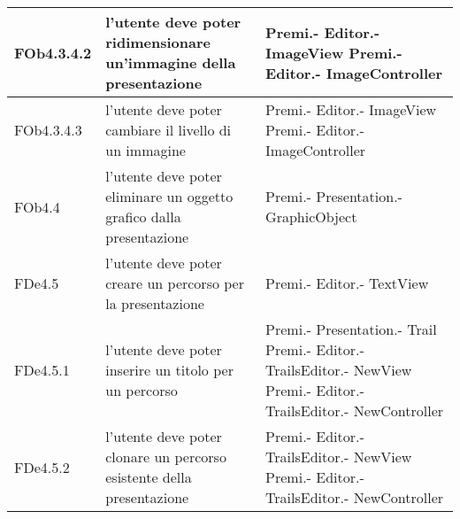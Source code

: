 \begin{longtable}{|l|p{5cm}|p{4cm}|}
\hline
FOb4.3.4.2 & l'utente deve poter ridimensionare un'immagine della presentazione & Premi.- \linebreak Editor.- \linebreak ImageView \linebreak Premi.- \linebreak Editor.- \linebreak ImageController \linebreak \\
\hline
FOb4.3.4.3 & l'utente deve poter cambiare il livello di un immagine & Premi.- \linebreak Editor.- \linebreak ImageView \linebreak Premi.- \linebreak Editor.- \linebreak ImageController \linebreak \\
\hline
FOb4.4 & l'utente deve poter eliminare un oggetto grafico dalla presentazione & Premi.- \linebreak Presentation.- \linebreak GraphicObject \linebreak \\
\hline
FDe4.5 & l'utente deve poter creare un percorso per la presentazione & Premi.- \linebreak Editor.- \linebreak TextView \linebreak \\
\hline
FDe4.5.1 & l'utente deve poter inserire un titolo per un percorso & Premi.- \linebreak Presentation.- \linebreak Trail \linebreak Premi.- \linebreak Editor.- \linebreak TrailsEditor.- \linebreak NewView \linebreak Premi.- \linebreak Editor.- \linebreak TrailsEditor.- \linebreak NewController \linebreak \\
\hline
FDe4.5.2 & l'utente deve poter clonare un percorso esistente della presentazione & Premi.- \linebreak Editor.- \linebreak TrailsEditor.- \linebreak NewView \linebreak Premi.- \linebreak Editor.- \linebreak TrailsEditor.- \linebreak NewController \linebreak \\

\end{longtable}
